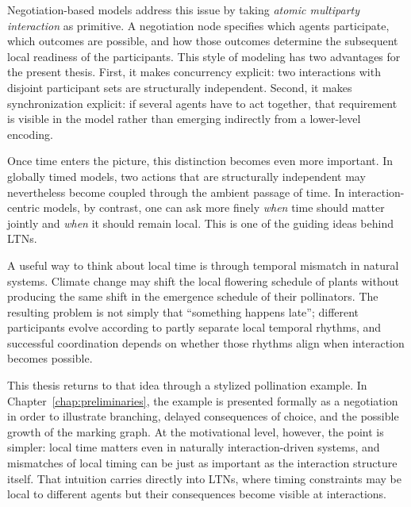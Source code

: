 Negotiation-based models address this issue by taking \emph{atomic multiparty interaction} as primitive. A negotiation node specifies which agents participate, which outcomes are possible, and how those outcomes determine the subsequent local readiness of the participants. This style of modeling has two advantages for the present thesis. First, it makes concurrency explicit: two interactions with disjoint participant sets are structurally independent. Second, it makes synchronization explicit: if several agents have to act together, that requirement is visible in the model rather than emerging indirectly from a lower-level encoding.

Once time enters the picture, this distinction becomes even more important. In globally timed models, two actions that are structurally independent may nevertheless become coupled through the ambient passage of time. In interaction-centric models, by contrast, one can ask more finely \emph{when} time should matter jointly and \emph{when} it should remain local. This is one of the guiding ideas behind LTNs.

\begin{tcolorbox}[width=\textwidth, colback={LightGrey1}, colframe=black, title={A natural local-time intuition: flowering and pollination}, colbacktitle=LightGrey3, coltitle=black]
A useful way to think about local time is through temporal mismatch in natural
systems. Climate change may shift the local flowering schedule of plants without
producing the same shift in the emergence schedule of their pollinators. The
resulting problem is not simply that ``something happens late''; different
participants evolve according to partly separate local temporal rhythms, and
successful coordination depends on whether those rhythms align when interaction
becomes possible.

This thesis returns to that idea through a stylized pollination example. In
Chapter~\ref{chap:preliminaries}, the example is presented formally as a
negotiation in order to illustrate branching, delayed consequences of choice,
and the possible growth of the marking graph. At the motivational level,
however, the point is simpler: local time matters even in naturally
interaction-driven systems, and mismatches of local timing can be just as
important as the interaction structure itself. That intuition carries directly
into LTNs, where timing constraints may be local to different agents but their
consequences become visible at interactions.
\end{tcolorbox}    

